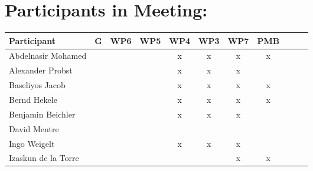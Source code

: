 \documentclass[a4paper, 11pt]{article}
\begin{document}
\section{Participants in Meeting:}

\begin{tabular}{|l|c|c|c|c||c|c|c||c|c|c|}
\hline
\textbf{Participant}  & \textbf{G} & \textbf{WP6} &  \textbf{WP5} & \textbf{WP4}&  \textbf{WP3} & \textbf{WP7}&  \textbf{PMB} \\\hline
Abdelnasir Mohamed    &   &   &   & x & x & x & x \\\hline 
Alexander Probst     &   &   &   & x & x & x &   \\\hline  
Baseliyos Jacob      &   &   &   & x & x & x & x \\\hline 
Bernd Hekele         &   &   &   & x & x & x & x \\\hline
Benjamin Beichler    &   &   &   & x & x & x &   \\\hline
David Mentre         &  &   &   &   &   &   &   \\\hline
Ingo Weigelt         &  &   &   & x & x & x &   \\\hline
Izaskun de la Torre  &  &   &   &   &   & x & x \\\hline

\end{tabular}
\end{document}
